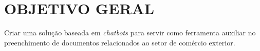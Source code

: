 \section{OBJETIVO GERAL}
\label{sec:objetivo_geral}

Criar uma solução baseada em \textit{chatbots} para servir como ferramenta auxiliar no preenchimento de documentos relacionados ao setor de comércio exterior.